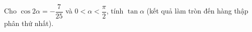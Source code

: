 \begin{ex}
Cho $\cos2\alpha=-\dfrac{7}{25}$ và $0<\alpha<\dfrac{\pi}{2}$, tính $\tan\alpha$ (kết quả làm tròn đến hàng thập phân thứ nhất).
\end{ex}
